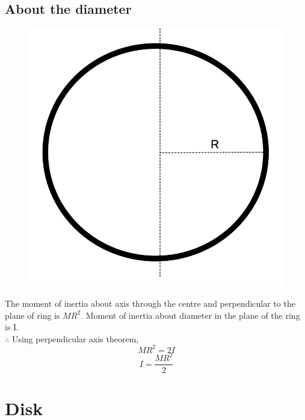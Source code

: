 \documentclass{article}
\begin{document}
\subsection{About the diameter}
\begin{figure}[h!]
  \centering
  \includegraphics[scale=0.3]{ring2.png}
\end{figure}
The moment of inertia about axis through the centre and perpendicular to the plane of ring is $MR^2$. Moment of inertia about diameter in the plane of the ring is I.\\
$\therefore$ Using perpendicular axis theorem,
$$MR^2 = 2I$$
$$\boxed{I = \frac{MR^2}{2}}$$

\section{Disk}
\end{document}
